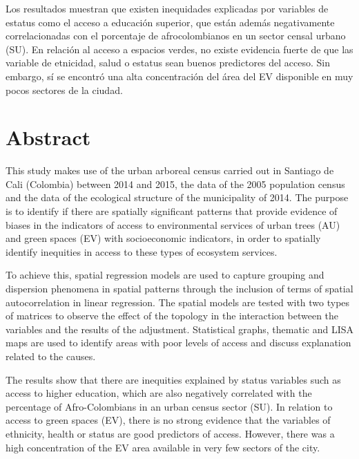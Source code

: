 \documentclass[12pt,a4paper,openany]{book}
\theoremstyle{definition}
\theoremstyle{definition}
\theoremstyle{definition}
\theoremstyle{remark}
\begin{document}
Los resultados muestran que existen inequidades explicadas por variables
de estatus como el acceso a educación superior, que están además
negativamente correlacionadas con el porcentaje de afrocolombianos en un
sector censal urbano (SU). En relación al acceso a espacios verdes, no
existe evidencia fuerte de que las variable de etnicidad, salud o
estatus sean buenos predictores del acceso. Sin embargo, sí se encontró
una alta concentración del área del EV disponible en muy pocos sectores
de la ciudad.

\chapter*{Abstract}\label{abstract}


This study makes use of the urban arboreal census carried out in
Santiago de Cali (Colombia) between 2014 and 2015, the data of the 2005
population census and the data of the ecological structure of the
municipality of 2014. The purpose is to identify if there are spatially
significant patterns that provide evidence of biases in the indicators
of access to environmental services of urban trees (AU) and green spaces
(EV) with socioeconomic indicators, in order to spatially identify
inequities in access to these types of ecosystem services.

To achieve this, spatial regression models are used to capture grouping
and dispersion phenomena in spatial patterns through the inclusion of
terms of spatial autocorrelation in linear regression. The spatial
models are tested with two types of matrices to observe the effect of
the topology in the interaction between the variables and the results of
the adjustment. Statistical graphs, thematic and LISA maps are used to
identify areas with poor levels of access and discuss explanation
related to the causes.

The results show that there are inequities explained by status variables
such as access to higher education, which are also negatively correlated
with the percentage of Afro-Colombians in an urban census sector (SU).
In relation to access to green spaces (EV), there is no strong evidence
that the variables of ethnicity, health or status are good predictors of
access. However, there was a high concentration of the EV area available
in very few sectors of the city.


\setcounter{tocdepth}{2} \tableofcontents
\end{document}
